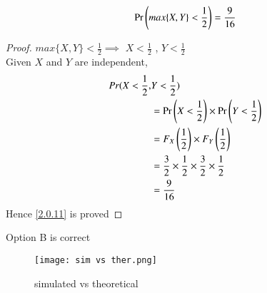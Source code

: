 \documentclass[journal,12pt,twocolumn]{IEEEtran}
\begin{document}
\begin{lemma}
\begin{align}
    \Pr\left({max\{X,Y\}<\frac{1}{2}}\right) = \frac{9}{16}\label{2.0.11}
\end{align}
\end{lemma}
\begin{proof}
\({max\{X,Y\}}<\frac{1}{2} \implies\) \(X<\frac{1}{2}\) , \(Y<\frac{1}{2}\)\\
Given \(X\) and \(Y\) are independent,
\begin{align}
    Pr(X<\frac{1}{2},&Y<\frac{1}{2})\\
    &=\Pr\left(X <\frac{1}{2}\right)\times \Pr\left(Y <\frac{1}{2}\right)\\
    &=F_X\left(\frac{1}{2}\right) \times F_Y\left(\frac{1}{2}\right)\\
   &=\frac{3}{2}\times\frac{1}{2}\times\frac{3}{2}\times\frac{1}{2}\\
    &=\frac{9}{16}
\end{align}
Hence \eqref{2.0.11} is proved
\end{proof}
Option B is correct
\begin{figure}[h!]
    \centering
    \texttt{[image: sim vs ther.png]}
    \caption{simulated vs theoretical}
    \label{fig:my_label}
\end{figure}
\end{document}
